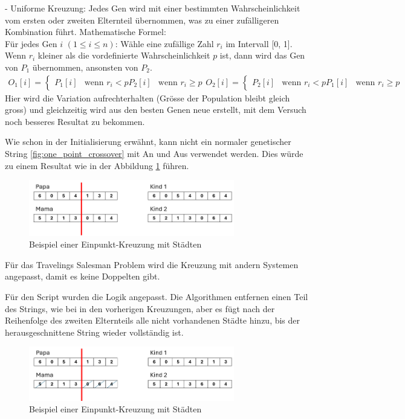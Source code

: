 - Uniforme Kreuzung: Jedes Gen wird mit einer bestimmten 
Wahrscheinlichkeit vom ersten oder zweiten Elternteil 
übernommen, was zu einer zufälligeren Kombination führt.
Mathematische Formel:\\
Für jedes Gen \( i \) \((1 \leq i \leq n)\):
Wähle eine zufällige Zahl \( r_i \) im Intervall [0, 1].\\
Wenn \( r_i \) kleiner als die vordefinierte Wahrscheinlichkeit 
\( p \) ist, dann wird das Gen von \( P_1 \) übernommen, 
ansonsten von \( P_2 \).
\begin{align*}
O_1[i] =
	\begin{cases} 
		P_1[i] & \text{wenn } r_i < p      
		P_2[i] & \text{wenn } r_i \geq p 
	\end{cases}


O_2[i] =
	\begin{cases} 
		P_2[i] & \text{wenn } r_i < p      
		P_1[i] & \text{wenn } r_i \geq p 
	\end{cases}

\end{align*}
Hier wird die Variation aufrechterhalten (Grösse der Population
bleibt gleich gross) und gleichzeitig wird aus den besten Genen 
neue erstellt, mit dem Versuch noch besseres Resultat zu bekommen.

Wie schon in der Initialisierung erwähnt, kann nicht ein normaler 
genetischer String \ref{fig:one_point_crossover} mit An und 
Aus verwendet werden. Dies würde zu einem Resultat wie in der Abbildung 
\ref{fig:one_point_crossover_cities} führen.

\begin{figure}
	\centering
	\includegraphics[width=0.8\textwidth]{
		papers/varalg/images/teil3/07GeneticStringCitiesCrossoverStandard.png
	}
	\caption{Beispiel einer Einpunkt-Kreuzung mit Städten}
	\label{fig:one_point_crossover_cities}
\end{figure}

Für das Travelings Salesman Problem wird die Kreuzung mit andern Systemen 
angepasst, damit es keine Doppelten gibt.

Für den Script wurden die Logik angepasst. Die Algorithmen entfernen einen 
Teil des Strings, wie bei in den vorherigen Kreuzungen, aber es fügt nach 
der Reihenfolge des zweiten Elternteils alle nicht vorhandenen 
Städte hinzu, bis der herausgeschnittene String wieder vollständig ist.

\begin{figure}
	\centering
	\includegraphics[width=0.8\textwidth]{
		papers/varalg/images/teil3/08GeneticStringCitiesCrossoverSimple.png
	}
	\caption{Beispiel einer Einpunkt-Kreuzung mit Städten}
	\label{fig:crossover_order_cities}
\end{figure}

